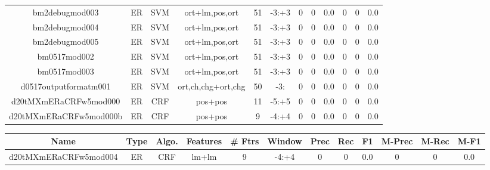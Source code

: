 \documentclass[a4paper]{article}
\begin{document}
\begin{landscape}
\begin{center}
\begin{tabular}{ |c|c|c|c|c|c|c|c|c|c|c|c|}
 
 	
 	\small{ bm2debugmod003 } & ER & SVM & ort+lm,pos,ort  &  51 &  -3:+3  &  0 & 0 & 0.0  &  0 & 0 & 0.0 \\
 	

 
 	
 	\small{ bm2debugmod004 } & ER & SVM & ort+lm,pos,ort  &  51 &  -3:+3  &  0 & 0 & 0.0  &  0 & 0 & 0.0 \\
 	

 
 	
 	\small{ bm2debugmod005 } & ER & SVM & ort+lm,pos,ort  &  51 &  -3:+3  &  0 & 0 & 0.0  &  0 & 0 & 0.0 \\
 	

 
 	
 	\small{ bm0517mod002 } & ER & SVM & ort+lm,pos,ort  &  51 &  -3:+3  &  0 & 0 & 0.0  &  0 & 0 & 0.0 \\
 	

 
 	
 	\small{ bm0517mod003 } & ER & SVM & ort+lm,pos,ort  &  51 &  -3:+3  &  0 & 0 & 0.0  &  0 & 0 & 0.0 \\
 	

 
 	
 	\small{ d0517outputformatm001 } & ER & SVM & ort,ch,chg+ort,chg  &  50 &  -3:  &  0 & 0 & 0.0  &  0 & 0 & 0.0 \\
 	

 
 	
 	\small{ d20tMXmERaCRFw5mod000 } & ER & CRF & pos+pos  &  11 &  -5:+5  &  0 & 0 & 0.0  &  0 & 0 & 0.0 \\
 	

 
 	
 	\small{ d20tMXmERaCRFw5mod000b } & ER & CRF & pos+pos  &  9 &  -4:+4  &  0 & 0 & 0.0  &  0 & 0 & 0.0 \\
 	
 \hline
\end{tabular}
\end{center}




\begin{center}
\begin{tabular}{ |c|c|c|c|c|c|c|c|c|c|c|c|} 
 \hline
 	Name & Type & Algo. & Features & \# Ftrs & Window & Prec & Rec & F1 & M-Prec & M-Rec & M-F1\\
 \hline

 	

 
 	
 	\small{ d20tMXmERaCRFw5mod004 } & ER & CRF & lm+lm  &  9 &  -4:+4  &  0 & 0 & 0.0  &  0 & 0 & 0.0 \\
 	


\end{tabular}
\end{center}
\end{landscape}
\end{document}
